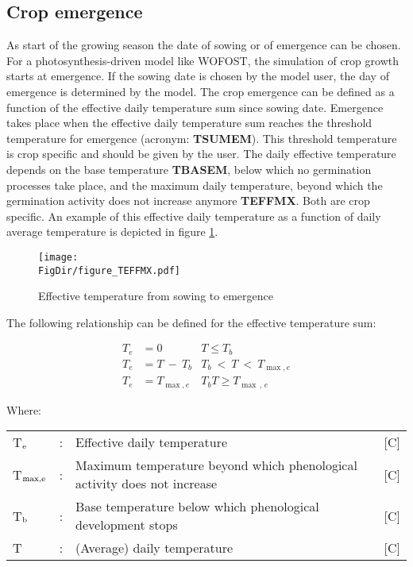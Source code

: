\subsection{Crop emergence}

As start of the growing season the date of sowing or of emergence can be chosen. For a
photosynthesis-driven model like WOFOST, the simulation of crop growth starts at
emergence. If the sowing date is chosen by the model user, the day of emergence is
determined by the model. The crop emergence can be
defined as a function of the effective daily temperature sum since sowing date. Emergence
takes place when the effective daily temperature sum reaches the threshold temperature
for emergence (acronym: {\bf TSUMEM}). This threshold temperature is crop specific and
should be given by the user. The daily effective temperature depends on the base
temperature {\bf TBASEM}, below which no germination processes take place, and the maximum daily
temperature, beyond which the germination activity does not increase anymore {\bf TEFFMX}.
Both are crop specific. An example of this effective daily temperature as a function of daily
average temperature is depicted in figure \ref{fig:TEFFMAX}.

\begin{figure}[p]
	\centering
	\texttt{[image: \\FigDir/figure\_TEFFMX.pdf]}
	\caption{Effective temperature from sowing to emergence} 
	\label{fig:TEFFMAX}
\end{figure}

The following relationship can be defined for the effective temperature sum:

\begin{align}
T_{e} &= 0            & T \le T _{b} \nonumber  \\
T_{e} &= T~-~ T _{b}  & T _{b} ~<~T ~ < ~T _{\max ,e} \nonumber  \\
T_{e} &= T _{\max ,e} & T _{b} T \ge  T _{\max \, ,\, e}
\end{align}

Where:\\[5pt]
\begin{tabularx}{\textwidth}{llXr}
	T$_{{\rm e}}$ &:& Effective daily temperature & 
	[\degrees C]\\
	T$_{{\rm max,e}}$ &:& Maximum temperature beyond which phenological 
	activity does not increase    &    [\degrees C]\\
	T$_{{\rm b}}$ &:& Base temperature below which phenological development stops & 
	[\degrees C]\\
	T  &:& (Average) daily temperature & [\degrees C]
\end{tabularx}


